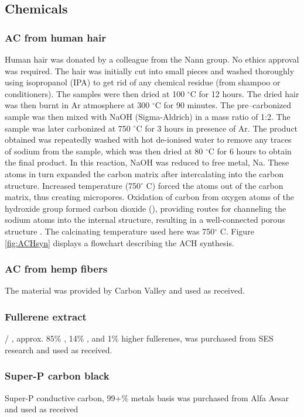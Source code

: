\documentclass{article}
\begin{document}
\subsection{Chemicals}
\subsubsection*{AC from human hair}
Human hair was donated by a colleague from the Nann group. No ethics approval was required. The hair was initially cut into small pieces and washed thoroughly using isopropanol (IPA) to get rid of any chemical residue (from shampoo or conditioners). The samples were then dried at 100 $^{\circ}$C for 12 hours. The dried hair was then burnt in Ar atmosphere at 300 $^{\circ}$C for 90 minutes. The pre–carbonized sample was then mixed with NaOH (Sigma-Aldrich) in a mass ratio of 1:2. The sample was later carbonized at 750 $^{\circ}$C for 3 hours in presence of Ar. The product obtained was repeatedly washed with hot de-ionised water to remove any traces of sodium from the sample, which was then dried at 80 $^{\circ}$C for 6 hours to obtain the final product. In this reaction, NaOH was reduced to free metal, Na. These atoms in turn expanded the carbon matrix after intercalating into the carbon structure. Increased temperature (750$^{\circ}$ C) forced the  atoms out of the carbon matrix, thus creating micropores. Oxidation of carbon from oxygen atoms of the hydroxide group formed carbon dioxide (), providing routes for channeling the sodium atoms into the internal structure, resulting in a well-connected porous structure \cite{satish_macroporous_2015}. The calcinating temperature used here was 750$^{\circ}$ C. Figure \ref{fig:ACHsyn} displays a flowchart describing the ACH synthesis. 

\subsubsection*{AC from hemp fibers}
The material was provided by Carbon Valley and used as received.

\subsubsection*{Fullerene extract}
/ , approx. 85\% , 14\% , and 1\% higher fullerenes, was purchased from SES research and used as received.

\subsubsection*{Super-P carbon black}
Super-P conductive carbon, 99+\% metals basis was purchased from Alfa Aesar and used as received
\end{document}
